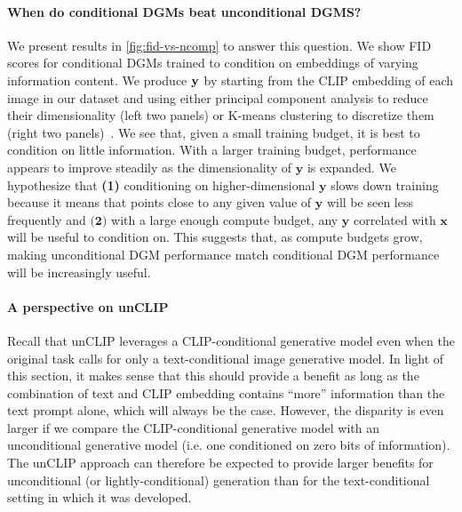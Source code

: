 \paragraph{When do conditional DGMs beat unconditional DGMS?}
%
We present results in \cref{fig:fid-vs-ncomp} to answer this question. We show FID scores for conditional DGMs trained to condition on embeddings of varying information content. 
%
We produce ${\mathbf{y}}$ by starting from the CLIP embedding of each image in our dataset and using either principal component analysis to reduce their dimensionality (left two panels) or K-means clustering to discretize them (right two panels)~\citep{hu2022self}.
%
We see that, given a small training budget, it is best to condition on little information. With a larger training budget, performance appears to improve steadily as the dimensionality of $\mathbf{y}$ is expanded. We hypothesize that \textbf{(1)} conditioning on higher-dimensional $\mathbf{y}$ slows down training because it means that points close to any given value of $\mathbf{y}$ will be seen less frequently and $\textbf{(2)}$ with a large enough compute budget, any $\mathbf{y}$ correlated with $\mathbf{x}$ will be useful to condition on. This suggests that, as compute budgets grow, making unconditional DGM performance match conditional DGM performance will be increasingly useful.

\paragraph{A perspective on unCLIP}
Recall that unCLIP leverages a CLIP-conditional generative model even when the original task calls for only a text-conditional image generative model. In light of this section, it makes sense that this should provide a benefit as long as the combination of text and CLIP embedding contains ``more'' information than the text prompt alone, which will always be the case. However, the disparity is even larger if we compare the CLIP-conditional generative model with an unconditional generative model  (i.e. one conditioned on zero bits of information). The unCLIP approach can therefore be expected to provide larger benefits for unconditional (or lightly-conditional) generation than for the text-conditional setting in which it was developed.


